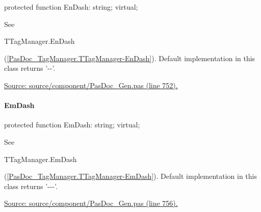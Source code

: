 \documentclass{report}
\newif\ifpdf
\begin{document}
\label{PasDoc_Gen.TDocGenerator-EnDash}
\begin{list}{}{
\setlength{\itemindent}{0cm}
\setlength{\listparindent}{0cm}
\setlength{\leftmargin}{\evensidemargin}
\addtolength{\leftmargin}{\tmplength}
\settowidth{\labelsep}{X}
\addtolength{\leftmargin}{\labelsep}
\setlength{\labelwidth}{\tmplength}
}
\item[\textbf{Declaration}\hfill]
\ifpdf
\begin{flushleft}
\fi
\begin{ttfamily}
protected function EnDash: string; virtual;\end{ttfamily}

\ifpdf
\end{flushleft}
\fi

\par
\item[\textbf{Description}]
See \begin{ttfamily}TTagManager.EnDash\end{ttfamily}(\ref{PasDoc_TagManager.TTagManager-EnDash}). Default implementation in this class returns '{-}{-}'.\par
\href{https://github.com/pasdoc/pasdoc/blob/master/source/component/PasDoc_Gen.pas#L752}{Source: source/component/PasDoc{\_}Gen.pas (line 752).}

\end{list}
\paragraph*{EmDash}\hspace*{\fill}

\label{PasDoc_Gen.TDocGenerator-EmDash}
\begin{list}{}{
\setlength{\itemindent}{0cm}
\setlength{\listparindent}{0cm}
\setlength{\leftmargin}{\evensidemargin}
\addtolength{\leftmargin}{\tmplength}
\settowidth{\labelsep}{X}
\addtolength{\leftmargin}{\labelsep}
\setlength{\labelwidth}{\tmplength}
}
\item[\textbf{Declaration}\hfill]
\ifpdf
\begin{flushleft}
\fi
\begin{ttfamily}
protected function EmDash: string; virtual;\end{ttfamily}

\ifpdf
\end{flushleft}
\fi

\par
\item[\textbf{Description}]
See \begin{ttfamily}TTagManager.EmDash\end{ttfamily}(\ref{PasDoc_TagManager.TTagManager-EmDash}). Default implementation in this class returns '{-}{-}{-}'.\par
\href{https://github.com/pasdoc/pasdoc/blob/master/source/component/PasDoc_Gen.pas#L756}{Source: source/component/PasDoc{\_}Gen.pas (line 756).}

\end{list}
\end{document}
